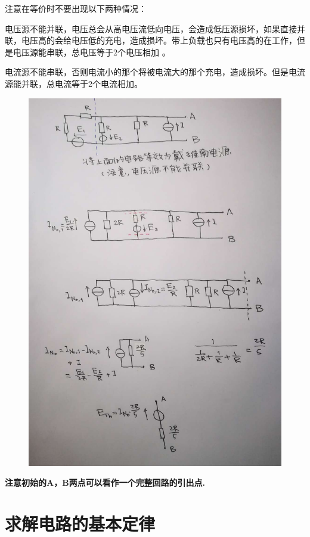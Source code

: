\documentclass[12pt]{book}
\theoremstyle{definition}\newtheorem{dfn}{Définition}[chapter]
\theoremstyle{plain}\newtheorem{thm}{Théorème}[chapter]
\theoremstyle{plain}\newtheorem{prp}{Proposition}[chapter]
\theoremstyle{plain}\newtheorem{lem}{\bf Lemme}[chapter]
\theoremstyle{plain}\newtheorem{axm}{\bf Axiome}[chapter]
\theoremstyle{plain}\newtheorem{lmm}{\bf Lemme}[chapter]
\theoremstyle{plain}\newtheorem{cor}{\bf Corollaire}[chapter]
\theoremstyle{remark}\newtheorem{rem}{Remarque}[chapter]
\begin{document}
注意在等价时不要出现以下两种情况：

{\color{red}电压源不能并联}，电压总会从高电压流低向电压，会造成低压源损坏，如果直接并联，电压高的会给电压低的充电，造成损坏。带上负载也只有电压高的在工作，但是电压源能串联，总电压等于2个电压相加 。

{\color{red}电流源不能串联}，否则电流小的那个将被电流大的那个充电，造成损坏。但是电流源能并联，总电流等于2个电流相加。

\begin{figure}[H]
	\centering
	\includegraphics[scale=0.4]{image//Electrocinetique cadre et concepts de base//3}
\end{figure}
\textbf{注意初始的A，B两点可以看作一个完整回路的引出点.}



\section{求解电路的基本定律}
\end{document}
